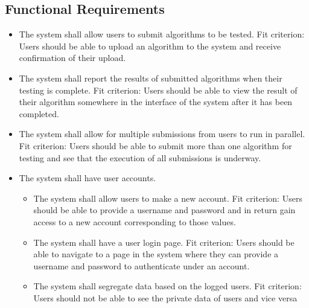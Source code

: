 \documentclass[12pt]{article}
\begin{document}
\subsection{Functional Requirements}
\begin{itemize}
    \item The system shall allow users to submit algorithms to be tested. \hfill \break
    Fit criterion: Users should be able to upload an algorithm to the system and receive confirmation of their upload.
\end{itemize}
\begin{itemize}
    \item The system shall report the results of submitted algorithms when their testing is complete. \hfill \break
    Fit criterion: Users should be able to view the result of their algorithm somewhere in the interface of the system after it has been completed.
\end{itemize}
\begin{itemize}
    \item The system shall allow for multiple submissions from users to run in parallel. \hfill \break
    Fit criterion: Users should be able to submit more than one algorithm for testing and see that the execution of all submissions is underway.
\end{itemize}
\begin{itemize}
    \item The system shall have user accounts. 
    \begin{itemize}
        \item The system shall allow users to make a new account. \hfill \break
        Fit criterion: Users should be able to provide a username and password and in return gain access to a new account corresponding to those values.
    \end{itemize}
    \begin{itemize}
        \item The system shall have a user login page. \hfill \break
        Fit criterion: Users should be able to navigate to a page in the system where they can provide a username and password to authenticate under an account.
    \end{itemize}
    \begin{itemize}
        \item The system shall segregate data based on the logged users. \hfill \break
        Fit criterion: Users should not be able to see the private data of users and vice versa
    \end{itemize}
\end{itemize}
\end{document}
